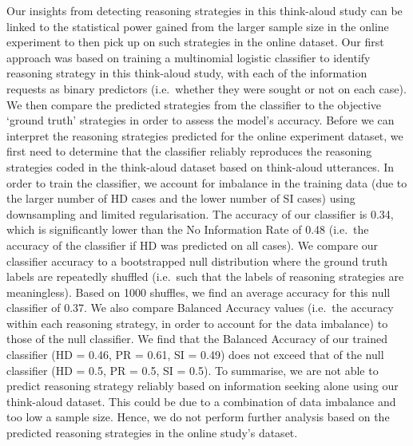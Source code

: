 \documentclass[a4paper, nobind]{templates/ociamthesis}
\begin{document}
Our insights from detecting reasoning strategies in this think-aloud study can be linked to the statistical power gained from the larger sample size in the online experiment to then pick up on such strategies in the online dataset. Our first approach was based on training a multinomial logistic classifier to identify reasoning strategy in this think-aloud study, with each of the information requests as binary predictors (i.e.~whether they were sought or not on each case). We then compare the predicted strategies from the classifier to the objective `ground truth' strategies in order to assess the model's accuracy. Before we can interpret the reasoning strategies predicted for the online experiment dataset, we first need to determine that the classifier reliably reproduces the reasoning strategies coded in the think-aloud dataset based on think-aloud utterances. In order to train the classifier, we account for imbalance in the training data (due to the larger number of HD cases and the lower number of SI cases) using downsampling and limited regularisation. The accuracy of our classifier is 0.34, which is significantly lower than the No Information Rate of 0.48 (i.e.~the accuracy of the classifier if HD was predicted on all cases). We compare our classifier accuracy to a bootstrapped null distribution where the ground truth labels are repeatedly shuffled (i.e.~such that the labels of reasoning strategies are meaningless). Based on 1000 shuffles, we find an average accuracy for this null classifier of 0.37. We also compare Balanced Accuracy values (i.e.~the accuracy within each reasoning strategy, in order to account for the data imbalance) to those of the null classifier. We find that the Balanced Accuracy of our trained classifier (HD = 0.46, PR = 0.61, SI = 0.49) does not exceed that of the null classifier (HD = 0.5, PR = 0.5, SI = 0.5). To summarise, we are not able to predict reasoning strategy reliably based on information seeking alone using our think-aloud dataset. This could be due to a combination of data imbalance and too low a sample size. Hence, we do not perform further analysis based on the predicted reasoning strategies in the online study's dataset.\\
\end{document}
